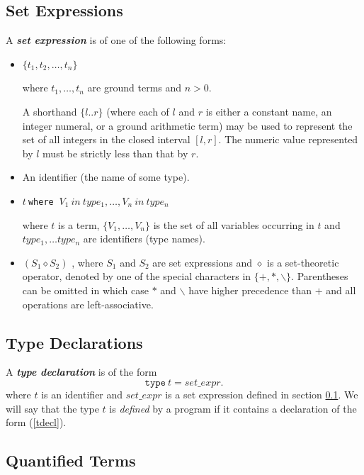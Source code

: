 \documentclass[a4paper,10pt]{article}
\begin{document}
\subsection{Set Expressions}\label{sexpr}

A \textbf{\textit{set expression}}  is of one of the following forms:
\begin{itemize}
\item $\{t_1,t_2, \ldots, t_n\}$

 where $t_1,\ldots,t_n$ are ground terms and $n>0$. 

A shorthand $\{l..r\}$ (where each of $l$ and $r$ is either a constant name, an integer numeral, or a ground arithmetic term) may be used to represent the  set of all integers in the closed interval $[l, r]$. The numeric value represented by $l$ must be strictly less than that by $r$.

\item An identifier (the name of some type).

\item $t~$\texttt{where} $~V_1~in~type_1,\ldots, V_n~in~type_n$
 
where $t$ is a term, $\{V_1, \ldots, V_n\}$ is the set of all variables occurring in $t$ and $type_1, \ldots type_n$ are identifiers (type names).

\item $(S_1 \diamond S_2)$ , where $S_1$ and $S_2$ are set expressions and $\diamond$ is a set-theoretic operator, denoted by one of the special characters in $\{+, *, \backslash \}$. Parentheses can be omitted in which case $*$ and $\backslash$ have higher precedence than $+$ and all operations are left-associative.
\end{itemize}

\subsection{Type Declarations}
A \textit{\textbf{type declaration}} is of the form 
\begin{equation}\label{tdecl}
\texttt{type}~t = set\_expr.
\end{equation}
where $t$ is an identifier and $set\_expr$ is a set expression defined in section \ref{sexpr}.
We will say that the type $t$ is \textit{defined} by a program if it contains a declaration of the form (\ref{tdecl}). 

\subsection{Quantified Terms}
\end{document}
